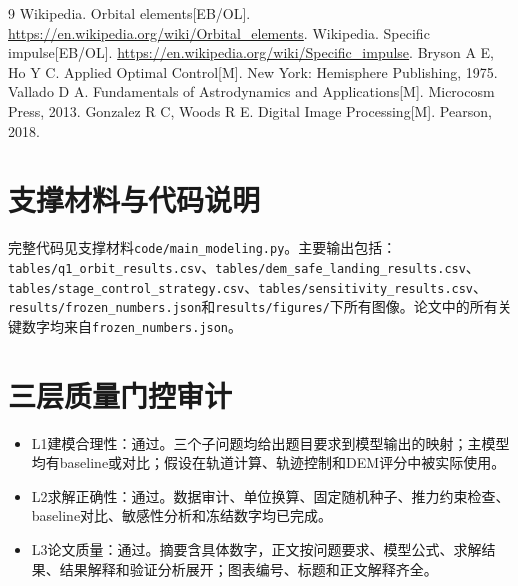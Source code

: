 \documentclass[UTF8,a4paper,12pt]{ctexart}
\begin{document}
\begin{thebibliography}{9}
 Wikipedia. Orbital elements[EB/OL]. \url{https://en.wikipedia.org/wiki/Orbital_elements}.
 Wikipedia. Specific impulse[EB/OL]. \url{https://en.wikipedia.org/wiki/Specific_impulse}.
 Bryson A E, Ho Y C. Applied Optimal Control[M]. New York: Hemisphere Publishing, 1975.
 Vallado D A. Fundamentals of Astrodynamics and Applications[M]. Microcosm Press, 2013.
 Gonzalez R C, Woods R E. Digital Image Processing[M]. Pearson, 2018.
\end{thebibliography}

\appendix
\section{支撑材料与代码说明}
完整代码见支撑材料\texttt{code/main\_modeling.py}。主要输出包括：\texttt{tables/q1\_orbit\_results.csv}、\texttt{tables/dem\_safe\_landing\_results.csv}、\texttt{tables/stage\_control\_strategy.csv}、\texttt{tables/sensitivity\_results.csv}、\texttt{results/frozen\_numbers.json}和\texttt{results/figures/}下所有图像。论文中的所有关键数字均来自\texttt{frozen\_numbers.json}。

\section{三层质量门控审计}
\begin{itemize}
  \item L1建模合理性：通过。三个子问题均给出题目要求到模型输出的映射；主模型均有baseline或对比；假设在轨道计算、轨迹控制和DEM评分中被实际使用。
  \item L2求解正确性：通过。数据审计、单位换算、固定随机种子、推力约束检查、baseline对比、敏感性分析和冻结数字均已完成。
  \item L3论文质量：通过。摘要含具体数字，正文按问题要求、模型公式、求解结果、结果解释和验证分析展开；图表编号、标题和正文解释齐全。
\end{itemize}
\end{document}
